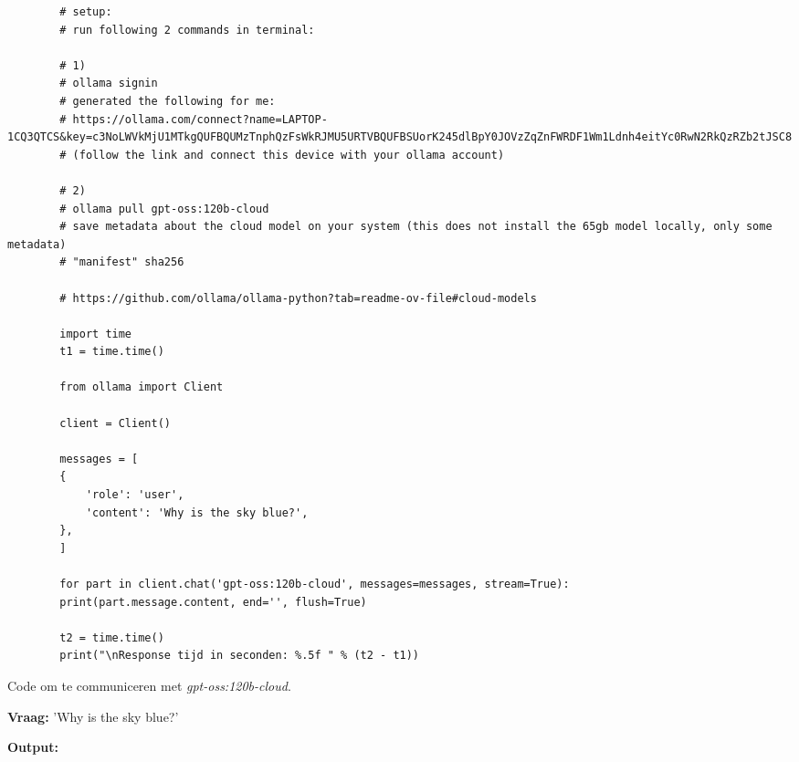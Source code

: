 \begin{listing}
    \begin{verbatim}
        # setup:
        # run following 2 commands in terminal:
        
        # 1)
        # ollama signin
        # generated the following for me:
        # https://ollama.com/connect?name=LAPTOP-1CQ3QTCS&key=c3NoLWVkMjU1MTkgQUFBQUMzTnphQzFsWkRJMU5URTVBQUFBSUorK245dlBpY0JOVzZqZnFWRDF1Wm1Ldnh4eitYc0RwN2RkQzRZb2tJSC8
        # (follow the link and connect this device with your ollama account)
        
        # 2)
        # ollama pull gpt-oss:120b-cloud
        # save metadata about the cloud model on your system (this does not install the 65gb model locally, only some metadata)
        # "manifest" sha256
        
        # https://github.com/ollama/ollama-python?tab=readme-ov-file#cloud-models
        
        import time
        t1 = time.time()
        
        from ollama import Client
        
        client = Client()
        
        messages = [
        {
            'role': 'user',
            'content': 'Why is the sky blue?',
        },
        ]
        
        for part in client.chat('gpt-oss:120b-cloud', messages=messages, stream=True):
        print(part.message.content, end='', flush=True)
        
        t2 = time.time()
        print("\nResponse tijd in seconden: %.5f " % (t2 - t1))
    \end{verbatim}
    \caption[Ollama Cloud-Signin Code]{Code om te communiceren met \textit{gpt-oss:120b-cloud}.}
    \label{lst:ollama-cloud-signin-test}
\end{listing}

\textbf{Vraag:} 'Why is the sky blue?'

\textbf{Output:} 

